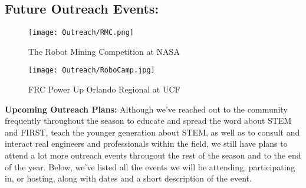 \clearpage
{}
\subsection*{\textbf{\Huge Future Outreach Events:}}
\vspace{.2cm}
\setlength{\parindent}{.25in} 


 \begin{figure}[htp]
 \centering
 \begin{minipage}{.48\textwidth}
   \centering
   \texttt{[image: Outreach/RMC.png]}  
   \caption{The Robot Mining Competition at NASA}
 \end{minipage}%
 \hfill
 \begin{minipage}{.48\textwidth}
   \centering
   \texttt{[image: Outreach/RoboCamp.jpg]}
   \caption{FRC Power Up Orlando Regional at UCF}
 \end{minipage}
 \end{figure}

\textbf {\large Upcoming Outreach Plans:}
\newline
Although we've reached out to the community frequently throughout the season to educate and spread the word about STEM and FIRST, teach the younger generation about STEM, as well as to consult and interact real engineers and professionals within the field, we still have plans to attend a lot more outreach events througout the rest of the season and to the end of the year. Below, we've listed all the events we will be attending, participating in, or hosting, along with dates and a short description of the event. 

